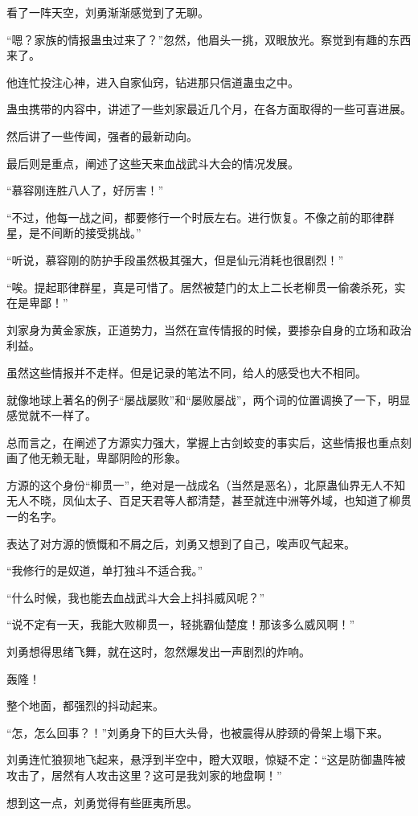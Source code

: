\begin{this_body}
看了一阵天空，刘勇渐渐感觉到了无聊。

“嗯？家族的情报蛊虫过来了？”忽然，他眉头一挑，双眼放光。察觉到有趣的东西来了。

他连忙投注心神，进入自家仙窍，钻进那只信道蛊虫之中。

蛊虫携带的内容中，讲述了一些刘家最近几个月，在各方面取得的一些可喜进展。

然后讲了一些传闻，强者的最新动向。

最后则是重点，阐述了这些天来血战武斗大会的情况发展。

“慕容刚连胜八人了，好厉害！”

“不过，他每一战之间，都要修行一个时辰左右。进行恢复。不像之前的耶律群星，是不间断的接受挑战。”

“听说，慕容刚的防护手段虽然极其强大，但是仙元消耗也很剧烈！”

“唉。提起耶律群星，真是可惜了。居然被楚门的太上二长老柳贯一偷袭杀死，实在是卑鄙！”

刘家身为黄金家族，正道势力，当然在宣传情报的时候，要掺杂自身的立场和政治利益。

虽然这些情报并不走样。但是记录的笔法不同，给人的感受也大不相同。

就像地球上著名的例子“屡战屡败”和“屡败屡战”，两个词的位置调换了一下，明显感觉就不一样了。

总而言之，在阐述了方源实力强大，掌握上古剑蛟变的事实后，这些情报也重点刻画了他无赖无耻，卑鄙阴险的形象。

方源的这个身份“柳贯一”，绝对是一战成名（当然是恶名），北原蛊仙界无人不知无人不晓，凤仙太子、百足天君等人都清楚，甚至就连中洲等外域，也知道了柳贯一的名字。

表达了对方源的愤慨和不屑之后，刘勇又想到了自己，唉声叹气起来。

“我修行的是奴道，单打独斗不适合我。”

“什么时候，我也能去血战武斗大会上抖抖威风呢？”

“说不定有一天，我能大败柳贯一，轻挑霸仙楚度！那该多么威风啊！”

刘勇想得思绪飞舞，就在这时，忽然爆发出一声剧烈的炸响。

轰隆！

整个地面，都强烈的抖动起来。

“怎，怎么回事？！”刘勇身下的巨大头骨，也被震得从脖颈的骨架上塌下来。

刘勇连忙狼狈地飞起来，悬浮到半空中，瞪大双眼，惊疑不定：“这是防御蛊阵被攻击了，居然有人攻击这里？这可是我刘家的地盘啊！”

想到这一点，刘勇觉得有些匪夷所思。


\end{this_body}
